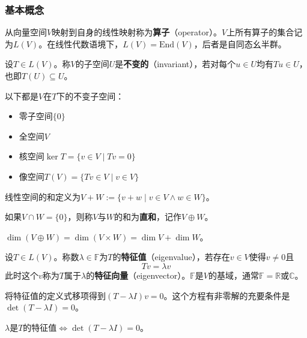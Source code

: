 \subsubsection{基本概念}
\begin{definition}[算子]
从向量空间$V$映射到自身的线性映射称为\textbf{算子}（operator）。$V$上所有算子的集合记为$L(V)$。在线性代数语境下，$L(V) = \text{End}(V)$，后者是自同态幺半群。
\end{definition}

\begin{definition}[不变子空间]
设$T \in L(V)$。称$V$的子空间$U$是\textbf{不变的}（invariant），若对每个$u \in U$均有$Tu \in U$，也即$T(U) \subseteq U$。
\end{definition}

\begin{example}
以下都是$V$在$T$下的不变子空间：
\begin{itemize}
    \item 零子空间$\{0\}$
    \item 全空间$V$
    \item 核空间$\ker T = \{v \in V \mid Tv = 0\}$
    \item 像空间$T(V) = \{Tv \in V \mid v \in V\}$
\end{itemize}
\end{example}

\begin{definition}[直和]
线性空间的和定义为$V + W := \{v + w \mid v \in V \land w \in W\}$。

如果$V \cap W = \{0\}$，则称$V$与$W$的和为\textbf{直和}，记作$V \oplus W$。
\end{definition}

\begin{theorem}
$\dim(V \oplus W) = \dim(V \times W) = \dim V + \dim W$。
\end{theorem}

\begin{definition}
设$T \in L(V)$。称数$\lambda \in \mathbb{F}$为$T$的\textbf{特征值}（eigenvalue），若存在$v \in V$使得$v \neq 0$且
\[
Tv = \lambda v
\]
此时这个$v$称为$T$属于$\lambda$的\textbf{特征向量}（eigenvector）。$\mathbb{F}$是$V$的基域，通常$\mathbb{F} = \mathbb{R}$或$\mathbb{C}$。
\end{definition}

将特征值的定义式移项得到$(T - \lambda I)v = 0$。这个方程有非零解的充要条件是$\det(T - \lambda I) = 0$。

\begin{theorem}
$\lambda$是$T$的特征值$\iff \det(T - \lambda I) = 0$。
\end{theorem}

